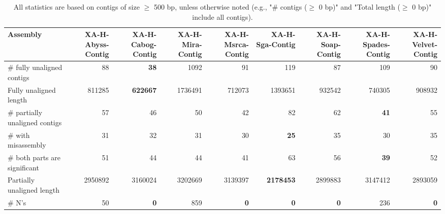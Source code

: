 \documentclass[12pt,a4paper]{article}
\begin{document}
\begin{table}[ht]
\begin{center}
\caption{All statistics are based on contigs of size $\geq$ 500 bp, unless otherwise noted (e.g., "\# contigs ($\geq$ 0 bp)" and "Total length ($\geq$ 0 bp)" include all contigs).}
\begin{tabular}{|l*{8}{|r}|}
\hline
Assembly & XA-H-Abyss-Contig & XA-H-Cabog-Contig & XA-H-Mira-Contig & XA-H-Msrca-Contig & XA-H-Sga-Contig & XA-H-Soap-Contig & XA-H-Spades-Contig & XA-H-Velvet-Contig \\ \hline
\# fully unaligned contigs & 88 & {\bf 38} & 1092 & 91 & 119 & 87 & 109 & 90 \\ \hline
Fully unaligned length & 811285 & {\bf 622667} & 1736491 & 712073 & 1393651 & 932542 & 740305 & 908932 \\ \hline
\# partially unaligned contigs & 57 & 46 & 50 & 42 & 82 & 62 & {\bf 41} & 55 \\ \hline
\hspace{5mm}\# with misassembly & 31 & 32 & 31 & 30 & {\bf 25} & 35 & 30 & 35 \\ \hline
\hspace{5mm}\# both parts are significant & 51 & 44 & 44 & 41 & 63 & 56 & {\bf 39} & 52 \\ \hline
Partially unaligned length & 2950892 & 3160024 & 3202669 & 3139397 & {\bf 2178453} & 2899883 & 3147412 & 2893059 \\ \hline
\# N's & 50 & {\bf 0} & 859 & {\bf 0} & {\bf 0} & {\bf 0} & 236 & {\bf 0} \\ \hline
\end{tabular}
\end{center}
\end{table}
\end{document}

